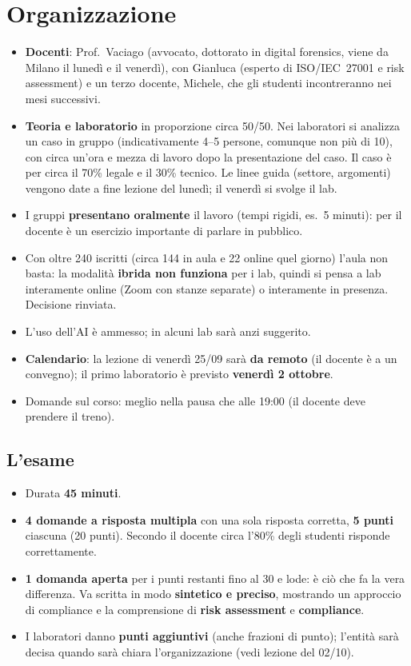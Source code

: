 \section{Organizzazione}
\begin{itemize}
  \item \textbf{Docenti}: Prof.~Vaciago (avvocato, dottorato in digital forensics, viene da Milano il
    lunedì e il venerdì), con Gianluca (esperto di ISO/IEC~27001 e risk assessment) e un terzo docente,
    Michele, che gli studenti incontreranno nei mesi successivi.
  \item \textbf{Teoria e laboratorio} in proporzione circa 50/50. Nei laboratori si analizza un caso
    in gruppo (indicativamente 4--5 persone, comunque non più di 10), con circa un'ora e mezza di lavoro
    dopo la presentazione del caso. Il caso è per circa il 70\% legale e il 30\% tecnico. Le linee guida
    (settore, argomenti) vengono date a fine lezione del lunedì; il venerdì si svolge il lab.
  \item I gruppi \textbf{presentano oralmente} il lavoro (tempi rigidi, es.\ 5 minuti): per il docente
    è un esercizio importante di parlare in pubblico.
  \item Con oltre 240 iscritti (circa 144 in aula e 22 online quel giorno) l'aula non basta: la
    modalità \textbf{ibrida non funziona} per i lab, quindi si pensa a lab interamente online (Zoom con
    stanze separate) o interamente in presenza. Decisione rinviata.
  \item L'uso dell'AI è ammesso; in alcuni lab sarà anzi suggerito.
  \item \textbf{Calendario}: la lezione di venerdì 25/09 sarà \textbf{da remoto} (il docente è a un
    convegno); il primo laboratorio è previsto \textbf{venerdì 2 ottobre}.
  \item Domande sul corso: meglio nella pausa che alle 19:00 (il docente deve prendere il treno).
\end{itemize}

\subsection{L'esame}
\begin{itemize}
  \item Durata \textbf{45 minuti}.
  \item \textbf{4 domande a risposta multipla} con una sola risposta corretta, \textbf{5 punti}
    ciascuna (20 punti). Secondo il docente circa l'80\% degli studenti risponde correttamente.
  \item \textbf{1 domanda aperta} per i punti restanti fino al 30 e lode: è ciò che fa la vera
    differenza. Va scritta in modo \textbf{sintetico e preciso}, mostrando un approccio di compliance
    e la comprensione di \textbf{risk assessment} e \textbf{compliance}.
  \item I laboratori danno \textbf{punti aggiuntivi} (anche frazioni di punto); l'entità sarà decisa
    quando sarà chiara l'organizzazione (vedi lezione del 02/10).
\end{itemize}

